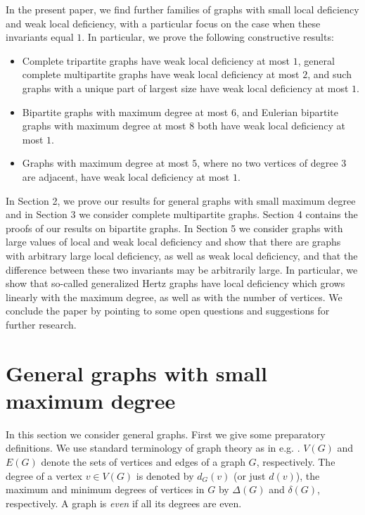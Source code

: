 \documentclass[12pt]{article}
\theoremstyle{plain}
\theoremstyle{definition}
\numberwithin{equation}{section}
\begin{document}
In the present paper, we find further families of graphs with small local deficiency
and weak local deficiency, with a particular focus on the case when these invariants equal $1$.
In particular, we prove the following constructive results:
\begin{itemize}
	
	\item  Complete tripartite graphs have weak local deficiency at most $1$, general complete multipartite graphs have weak local deficiency at most $2$,
	and such graphs with a unique part of largest size have weak local deficiency at most $1$.

	\item
	Bipartite graphs with maximum degree at most $6$, %
	and
	Eulerian bipartite graphs with maximum degree at most $8$ both have 
	weak local deficiency at most $1$.

	\item Graphs with maximum degree at most $5$, where no two vertices of degree $3$ are adjacent, have weak local deficiency at most $1$.
	


\end{itemize}

	In Section 2, we prove our results for general graphs with small maximum degree
	and in Section 3 we consider complete multipartite graphs. Section 4 contains the proofs of our results on
	bipartite graphs.
	In Section 5 we consider graphs with large values of local and weak local deficiency
	and show that there are graphs with arbitrary large local deficiency, as well as weak local deficiency, 
	and that the difference
	between these two invariants may be arbitrarily large.
	In particular, we show that so-called generalized Hertz graphs have local deficiency 
	which grows linearly with the maximum degree, as well as with the number of vertices.
	We conclude the paper by pointing to some open questions and suggestions for further
	research.




\section{General graphs with small maximum degree}

	In this section we consider general graphs. 
First we give some preparatory definitions.
We use standard terminology of graph theory as in
e.g. \cite{West}.
$V(G)$ and $E(G)$ denote the sets of vertices and edges of a graph $G$, respectively. The degree of a vertex $v\in V(G)$ is denoted by $d_{G}(v)$ (or just $d(v)$), the maximum and minimum degrees of vertices in $G$ by $\Delta(G)$ and $\delta(G)$, respectively. A graph is {\em even} if all its degrees are even.
\end{document}

